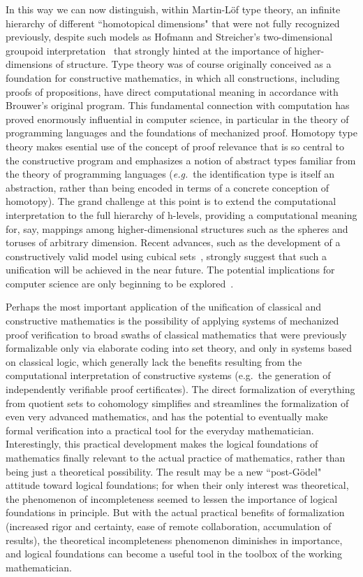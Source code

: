 \documentclass[11pt]{article}
\theoremstyle{remark}
\theoremstyle{definition}
\begin{document}
In this way we can now distinguish, within Martin-L\"{o}f type theory, an infinite hierarchy of different ``homotopical dimensions" that were not fully recognized previously, despite such models as Hofmann and Streicher's two-dimensional groupoid interpretation~\cite{HS} that strongly hinted at the importance of higher-dimensions of structure.
Type theory was of course originally conceived
as a foundation for constructive mathematics, in which all constructions, including proofs of propositions, have direct
computational meaning in accordance with Brouwer's original program.  This fundamental connection with computation has
proved enormously influential in computer science, in particular in the theory of programming languages and the
foundations of mechanized proof.  Homotopy type theory makes esential use of the concept of proof relevance that is so
central to the constructive program and emphasizes a notion of abstract types familiar from the theory of programming
languages (\textit{e.g.}\ the identification type is itself an abstraction, rather than being encoded in terms of a
concrete conception of homotopy).  The grand challenge at this point is to extend the computational interpretation to
the full hierarchy of h-levels, providing a computational meaning for, say, mappings among higher-dimensional structures
such as the spheres and toruses of arbitrary dimension.  Recent advances, such as the development of a constructively
valid model using cubical sets~\cite{BCH}, strongly suggest that such a unification will be achieved in the near future.
The potential implications for computer science are only beginning to be explored~\cite{AMLH}.

Perhaps the most important application of the unification of classical and constructive mathematics is the possibility of
applying systems of mechanized proof verification to broad swaths of classical mathematics that were previously
formalizable only via elaborate coding into set theory, and only in systems based on classical logic, which generally
lack the benefits resulting from the computational interpretation of constructive systems (e.g.\ the generation of
independently verifiable proof certificates).  The direct formalization of everything from quotient sets to cohomology simplifies 
and streamlines the formalization of even very advanced mathematics, and has the
potential to eventually make formal verification into a practical tool for the everyday mathematician.  Interestingly,
this practical development makes the logical foundations of mathematics finally relevant to the actual practice of
mathematics, rather than being just a theoretical possibility.  The result may be a new ``post-G\"odel" attitude toward
logical foundations; for when their only interest was theoretical, the phenomenon of incompleteness seemed to lessen the
importance of logical foundations in principle.  But with the actual practical benefits of formalization (increased
rigor and certainty, ease of remote collaboration, accumulation of results), the theoretical incompleteness phenomenon
diminishes in importance, and logical foundations can become a useful tool in the toolbox of the working mathematician.
\end{document}
